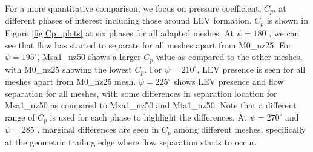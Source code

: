 For a more quantitative comparison, we focus on pressure coefficient, $C_p$,  at different phases of interest including those around LEV formation. $C_p$ is shown in Figure \ref{fig:Cp_plots} at six phases for all adapted meshes. At $\psi=180^\circ$, we can see that flow has started to separate for all meshes apart from M0\_nz25. For $\psi=195^\circ$, Msa1\_nz50 shows a larger $C_p$ value as compared to the other meshes, with M0\_nz25 showing the lowest $C_p$. For $\psi=210^\circ$, LEV presence is seen for all meshes apart from M0\_nz25 mesh. $\psi=225^\circ$ shows LEV presence and flow separation for all meshes, with some differences in separation location for Msa1\_nz50 as compared to Mza1\_nz50 and Mfa1\_nz50. Note that a different range of $C_p$ is used for each phase to highlight the differences. At
$\psi=270^\circ$ and $\psi=285^\circ$, marginal differences are seen in $C_p$ among different meshes, specifically at the geometric trailing edge where flow separation starts to occur. 



